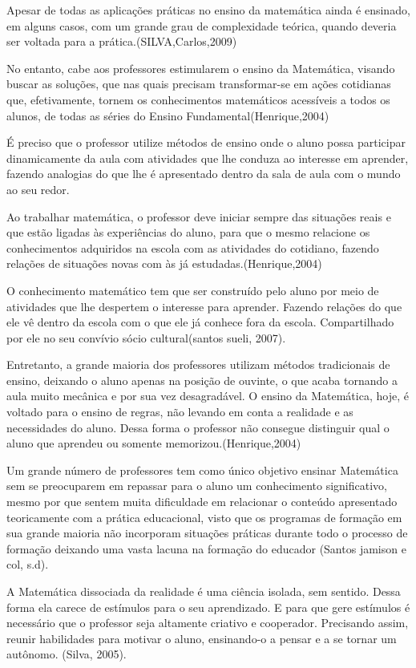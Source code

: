 \documentclass[12pt,a4paper]{article}
\begin{document}
Apesar de todas as aplicações práticas no ensino da matemática ainda é ensinado, em 
alguns casos, com um grande grau de complexidade teórica, quando deveria ser voltada para a prática.(SILVA,Carlos,2009)

No entanto, cabe aos professores estimularem o ensino da Matemática, visando 	buscar as soluções, que nas quais precisam transformar-se em ações cotidianas 	que, efetivamente, tornem os conhecimentos matemáticos acessíveis a todos os 	alunos, de todas as séries do Ensino Fundamental(Henrique,2004)

É preciso que o professor utilize métodos de ensino onde o aluno possa participar dinamicamente da aula com atividades que lhe conduza ao interesse em aprender, fazendo analogias do que lhe é apresentado dentro da sala de aula com o mundo ao seu redor. 

Ao trabalhar matemática, o professor deve iniciar sempre das situações reais e que estão ligadas às experiências do aluno, para que o mesmo relacione os conhecimentos adquiridos na escola com as atividades do cotidiano, fazendo relações de situações novas com às já estudadas.(Henrique,2004)
	
O conhecimento matemático tem que ser construído pelo aluno por meio de 	atividades que lhe despertem o interesse para aprender. Fazendo relações do que 	ele vê dentro da escola com o que ele já conhece fora da escola. Compartilhado por ele no seu convívio sócio cultural(santos sueli, 2007).

Entretanto, a grande maioria dos professores utilizam métodos tradicionais de ensino, deixando o aluno apenas na posição de ouvinte, o que acaba tornando a aula muito mecânica e por sua vez desagradável.
O ensino da Matemática, hoje, é voltado para 	o ensino de regras, não levando em conta a realidade e as necessidades do aluno. Dessa forma o professor não consegue distinguir  qual o aluno que aprendeu ou somente memorizou.(Henrique,2004)
	
Um grande número de professores tem como único objetivo ensinar Matemática 	sem se preocuparem em repassar para o aluno um conhecimento significativo, 	mesmo por que sentem muita dificuldade em relacionar o conteúdo apresentado 	teoricamente com a prática educacional, visto que os programas de formação 	em 	sua grande maioria não incorporam situações práticas durante todo o 	processo de 	formação deixando uma vasta lacuna na formação do educador (Santos jamison e  col, s.d).

A  Matemática dissociada da realidade é uma ciência isolada, sem sentido. Dessa forma ela carece de estímulos para o seu aprendizado. E para que gere estímulos é necessário que o professor seja altamente criativo e cooperador. Precisando assim, reunir habilidades para motivar o aluno, ensinando-o a pensar e a se tornar um autônomo. (Silva, 2005).
\end{document}
